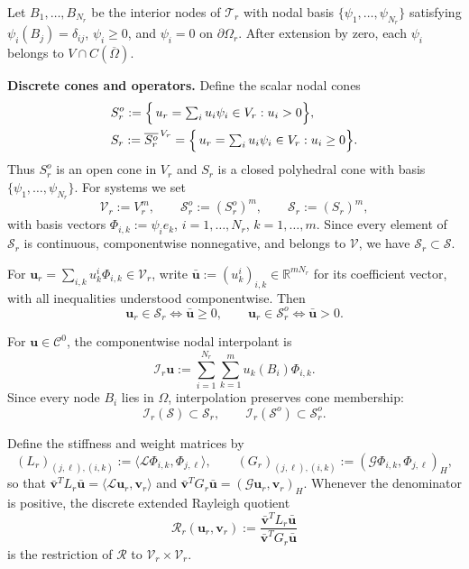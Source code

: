 \documentclass[10pt,a4paper]{amsart}
\begin{document}
Let $B_1,\ldots,B_{N_r}$ be the interior nodes of $\mathcal{T}_r$ with nodal
basis $\{\psi_1,\ldots,\psi_{N_r}\}$ satisfying $\psi_i(B_j)=\delta_{ij}$,
$\psi_i\ge0$, and $\psi_i=0$ on $\partial\Omega_r$. After extension by zero,
each $\psi_i$ belongs to $V\cap C(\overline\Omega)$.

\medskip

\noindent\textbf{Discrete cones and operators.}\;
Define the scalar nodal cones
\begin{align*}
	&S_r^o
	:= \Bigl\{\,u_r=\textstyle\sum_i u_i\psi_i\in V_r : u_i>0\Bigr\},
	\\
	&S_r
	:= \overline{S_r^o}^{\,V_r}
	= \Bigl\{\,u_r=\textstyle\sum_i u_i\psi_i\in V_r : u_i\ge0\Bigr\}.
\end{align*}
Thus $S_r^o$ is an open cone in $V_r$ and $S_r$ is a closed polyhedral cone
with basis $\{\psi_1,\ldots,\psi_{N_r}\}$. For systems we set
\[
\mathcal{V}_r := V_r^m, \qquad
\mathcal{S}_r^o := (S_r^o)^m, \qquad
\mathcal{S}_r := (S_r)^m,
\]
with basis vectors $\Phi_{i,k}:=\psi_i e_k$, $i=1,\ldots,N_r$,
$k=1,\ldots,m$. Since every element of $\mathcal{S}_r$ is continuous,
componentwise nonnegative, and belongs to $\mathcal{V}$, we have
$\mathcal{S}_r\subset\mathcal{S}$.

\medskip

For $\mathbf{u}_r=\sum_{i,k}u_k^i\Phi_{i,k}\in\mathcal{V}_r$, write
$\bar{\mathbf{u}}:=(u_k^i)_{i,k}\in\mathbb{R}^{mN_r}$ for its coefficient
vector, with all inequalities understood componentwise. Then
\[
\mathbf{u}_r\in\mathcal{S}_r \Longleftrightarrow \bar{\mathbf{u}}\ge0,
\qquad
\mathbf{u}_r\in\mathcal{S}_r^o \Longleftrightarrow \bar{\mathbf{u}}>0.
\]

For $\mathbf{u}\in\mathcal{C}^0$, the componentwise nodal interpolant is
\[
\mathcal{I}_r\mathbf{u}
:= \sum_{i=1}^{N_r}\sum_{k=1}^m u_k(B_i)\Phi_{i,k}.
\]
Since every node $B_i$ lies in $\Omega$, interpolation preserves cone membership:
\begin{equation}\label{eq:positive-interpolation}
	\mathcal{I}_r(\mathcal{S})\subset\mathcal{S}_r,
	\qquad
	\mathcal{I}_r(\mathcal{S}^o)\subset\mathcal{S}_r^o.
\end{equation}

Define the stiffness and weight matrices by
\[
(L_r)_{(j,\ell),(i,k)}
:= \langle\mathcal{L}\Phi_{i,k},\Phi_{j,\ell}\rangle,
\qquad
(G_r)_{(j,\ell),(i,k)}
:= (\mathcal{G}\Phi_{i,k},\Phi_{j,\ell})_H,
\]
so that $\bar{\mathbf{v}}^T L_r\bar{\mathbf{u}}=\langle\mathcal{L}\mathbf{u}_r,
\mathbf{v}_r\rangle$ and $\bar{\mathbf{v}}^T G_r\bar{\mathbf{u}}=
(\mathcal{G}\mathbf{u}_r,\mathbf{v}_r)_H$. Whenever the denominator is positive,
the discrete extended Rayleigh quotient
\begin{equation}\label{eq:discrete-Rayleigh}
	\mathcal{R}_r(\mathbf{u}_r,\mathbf{v}_r)
	:= \frac{\bar{\mathbf{v}}^T L_r\bar{\mathbf{u}}}
	{\bar{\mathbf{v}}^T G_r\bar{\mathbf{u}}}
\end{equation}
is the restriction of $\mathcal{R}$ to $\mathcal{V}_r\times\mathcal{V}_r$.
\end{document}
